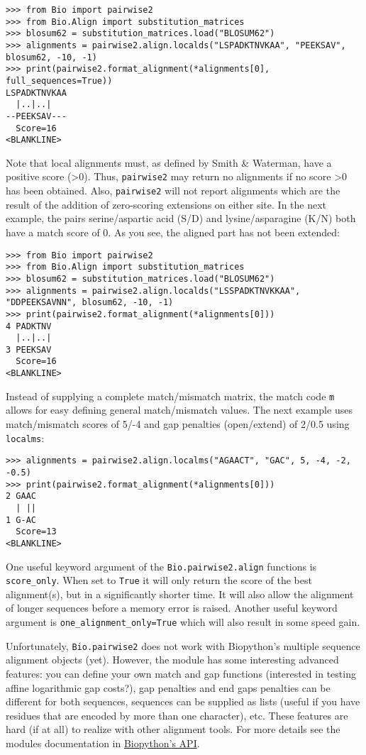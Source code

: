 \begin{verbatim}
>>> from Bio import pairwise2
>>> from Bio.Align import substitution_matrices
>>> blosum62 = substitution_matrices.load("BLOSUM62")
>>> alignments = pairwise2.align.localds("LSPADKTNVKAA", "PEEKSAV", blosum62, -10, -1)
>>> print(pairwise2.format_alignment(*alignments[0], full_sequences=True))
LSPADKTNVKAA
  |..|..|   
--PEEKSAV---
  Score=16
<BLANKLINE>
\end{verbatim}

Note that local alignments must, as defined by Smith \& Waterman, have a
positive score (\textgreater 0). Thus, \verb|pairwise2| may return no
alignments if no score \textgreater 0 has been obtained. Also, \verb|pairwise2|
will not report alignments which are the result of the addition of zero-scoring
extensions on either site. In the next example, the pairs serine/aspartic acid (S/D)
and lysine/asparagine (K/N) both have a match score of 0. As you see, the aligned
part has not been extended:

\begin{verbatim}
>>> from Bio import pairwise2
>>> from Bio.Align import substitution_matrices
>>> blosum62 = substitution_matrices.load("BLOSUM62")
>>> alignments = pairwise2.align.localds("LSSPADKTNVKKAA", "DDPEEKSAVNN", blosum62, -10, -1)
>>> print(pairwise2.format_alignment(*alignments[0]))
4 PADKTNV
  |..|..|
3 PEEKSAV
  Score=16
<BLANKLINE>
\end{verbatim}

Instead of supplying a complete match/mismatch matrix, the match code
\texttt{m} allows for easy defining general match/mismatch values. The next
example uses match/mismatch scores of 5/-4 and gap penalties (open/extend)
of 2/0.5 using \verb|localms|:

\begin{verbatim}
>>> alignments = pairwise2.align.localms("AGAACT", "GAC", 5, -4, -2, -0.5)
>>> print(pairwise2.format_alignment(*alignments[0]))
2 GAAC
  | ||
1 G-AC
  Score=13
<BLANKLINE>
\end{verbatim}

One useful keyword argument of the \verb|Bio.pairwise2.align| functions is
\texttt{score\_only}. When set to \texttt{True} it will only return the score
of the best alignment(s), but in a significantly shorter time. It will also
allow the alignment of longer sequences before a memory error is raised.
Another useful keyword argument is \texttt{one\_alignment\_only=True} which
will also result in some speed gain.

Unfortunately, \verb|Bio.pairwise2| does not work with Biopython's multiple
sequence alignment objects (yet).
However, the module has some interesting advanced features: you can
define your own match and gap functions (interested in testing affine
logarithmic gap costs?), gap penalties and end gaps penalties can be different
for both sequences, sequences can be supplied as lists (useful if you have
residues that are encoded by more than one character), etc. These features
are hard (if at all) to realize with other alignment tools. For more details
see the modules documentation in
\href{http://biopython.org/docs/\bpversion/api/Bio.pairwise2.html}{Biopython's API}.

